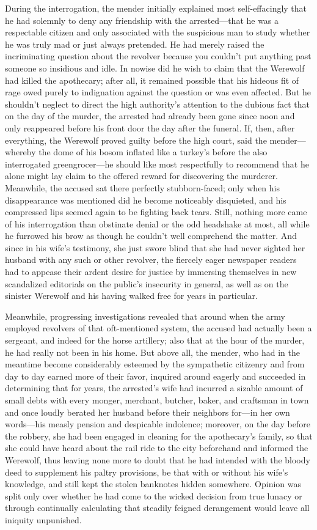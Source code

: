 \documentclass[12pt,a4paper]{article}
\begin{document}
During the interrogation, the mender initially explained most self-effacingly that he had solemnly to deny any friendship with the arrested—that he was a respectable citizen and only associated with the suspicious man to study whether he was truly mad or just always pretended. He had merely raised the incriminating question about the revolver because you couldn’t put anything past someone so insidious and idle. In nowise did he wish to claim that the Werewolf had killed the apothecary; after all, it remained possible that his hideous fit of rage owed purely to indignation against the question or was even affected. But he shouldn’t neglect to direct the high authority’s attention to the dubious fact that on the day of the murder, the arrested had already been gone since noon and only reappeared before his front door the day after the funeral. If, then, after everything, the Werewolf proved guilty before the high court, said the mender—whereby the dome of his bosom inflated like a turkey’s before the also interrogated greengrocer—he should like most respectfully to recommend that he alone might lay claim to the offered reward for discovering the murderer. Meanwhile, the accused sat there perfectly stubborn-faced; only when his disappearance was mentioned did he become noticeably disquieted, and his compressed lips seemed again to be fighting back tears. Still, nothing more came of his interrogation than obstinate denial or the odd headshake at most, all while he furrowed his brow as though he couldn’t well comprehend the matter. And since in his wife’s testimony, she just swore blind that she had never sighted her husband with any such or other revolver, the fiercely eager newspaper readers had to appease their ardent desire for justice by immersing themselves in new scandalized editorials on the public’s insecurity in general, as well as on the sinister Werewolf and his having walked free for years in particular.

Meanwhile, progressing investigations revealed that around when the army employed revolvers of that oft-mentioned system, the accused had actually been a sergeant, and indeed for the horse artillery; also that at the hour of the murder, he had really not been in his home. But above all, the mender, who had in the meantime become considerably esteemed by the sympathetic citizenry and from day to day earned more of their favor, inquired around eagerly and succeeded in determining that for years, the arrested’s wife had incurred a sizable amount of small debts with every monger, merchant, butcher, baker, and craftsman in town and once loudly berated her husband before their neighbors for—in her own words—his measly pension and despicable indolence; moreover, on the day before the robbery, she had been engaged in cleaning for the apothecary’s family, so that she could have heard about the rail ride to the city beforehand and informed the Werewolf, thus leaving none more to doubt that he had intended with the bloody deed to supplement his paltry provisions, be that with or without his wife’s knowledge, and still kept the stolen banknotes hidden somewhere. Opinion was split only over whether he had come to the wicked decision from true lunacy or through continually calculating that steadily feigned derangement would leave all iniquity unpunished.
\end{document}

